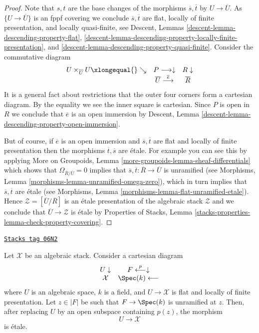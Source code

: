 \begin{proof}
\medskip\noindent
Note that $s, t$ are the base changes of the morphisms
$\overline{s}, \overline{t}$ by $U \to \overline{U}$.
As $\{U \to \overline{U}\}$ is an fppf covering we conclude
$\overline{s}, \overline{t}$ are flat, locally of finite presentation, and
locally quasi-finite, see
Descent, Lemmas \ref{descent-lemma-descending-property-flat},
\ref{descent-lemma-descending-property-locally-finite-presentation}, and
\ref{descent-lemma-descending-property-quasi-finite}.
Consider the commutative diagram
$$
\begin{array}{ccc}U \times_{\overline{U}} U \xlongequal{}\searrow & P \longrightarrow\downarrow & R \downarrow \\  & \overline{U} \overset{\overline{e}}{\longrightarrow} & \overline{R}\end{array}
$$
It is a general fact about restrictions that the outer four corners
form a cartesian diagram. By the equality we see the inner square is
cartesian. Since $P$ is open in $R$ we conclude that $\overline{e}$
is an open immersion by
Descent, Lemma \ref{descent-lemma-descending-property-open-immersion}.

\medskip\noindent
But of course, if $\overline{e}$ is an open immersion and
$\overline{s}, \overline{t}$ are flat and locally of finite presentation
then the morphisms $\overline{t}, \overline{s}$ are \'etale.
For example you can see this by applying
More on Groupoids, Lemma \ref{more-groupoids-lemma-sheaf-differentials}
which shows that $\Omega_{\overline{R}/\overline{U}} = 0$
implies that $\overline{s}, \overline{t} : \overline{R} \to \overline{U}$
is unramified (see
Morphisms, Lemma \ref{morphisms-lemma-unramified-omega-zero}),
which in turn implies that $\overline{s}, \overline{t}$ are \'etale
(see
Morphisms, Lemma \ref{morphisms-lemma-flat-unramified-etale}).
Hence $\mathcal{Z} = [\overline{U}/\overline{R}]$ is an \'etale
presentation of the algebraic stack $\mathcal{Z}$ and we conclude that
$\overline{U} \to \mathcal{Z}$ is \'etale by
Properties of Stacks, Lemma
\ref{stacks-properties-lemma-check-property-covering}.
\end{proof}

\begin{lemma}
\label{stacks-morphisms-lemma-etale-at-point}
\href{https://stacks.math.columbia.edu/tag/06N2}{\texttt{Stacks tag 06N2}}

Let $\mathcal{X}$ be an algebraic stack. Consider a cartesian diagram
$$
\begin{array}{cc}U \downarrow & F \overset{p}{\longleftarrow}\downarrow \\ \mathcal{X} & \Spec(k) \longleftarrow\end{array}
$$
where $U$ is an algebraic space, $k$ is a field, and $U \to \mathcal{X}$
is flat and locally of finite presentation. Let $z \in |F|$ be such that
$F \to \Spec(k)$ is unramified at $z$. Then, after replacing $U$ by
an open subspace containing $p(z)$, the morphism
$$
U \longrightarrow \mathcal{X}
$$
is \'etale.
\end{lemma}

